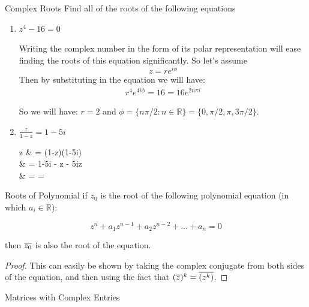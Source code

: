 \begin{example}{Complex Roots}
	Find all of the roots of the following equations
	
	\begin{enumerate}
		\item $z^4 -16 = 0$
		\begin{sol}
			Writing the complex number in the form of its polar representation will ease finding the roots of this equation significantly. So let's assume \[ z = r e^{i\phi} \]
			Then by substituting in the equation we will have:
			\begin{align*}
			r^4 e^{4i\phi} = 16 = 16 e^{2n\pi i}
			\end{align*}
			
			So we will have: $r = 2$ and $\phi = \{ n \pi /2: n \in \mathbb{R} \} = \{ 0, \pi/2, \pi, 3\pi/2 \}$.
		\end{sol}
		\item $\frac{z}{1-z} = 1-5i$
		\begin{sol}
			\begin{flalign*}
				z  & = (1-z)(1-5i) \\
				& = 1-5i - z - 5iz \\
				& =  = 
		\end{flalign*}
		
		\end{sol}
	\end{enumerate}
\end{example}

\begin{propbox}{Roots of Polynomial}
	if $z_0$ is the root of the following polynomial equation (in which $a_i \in \mathbb{R}$):
	
	\[ z^n + a_1 z^{n-1} + a_2 z^{n-2} + \ldots + a_n = 0 \]
	
	then $\overline{z_0}$ is also the root of the equation.

\end{propbox}

\begin{proof}
	This can easily be shown by taking the complex conjugate from both sides of the equation, and then using the fact that $(\overline{z})^k = \overline{(z^k)}$.

\end{proof}


\begin{example}{Matrices with Complex Entries}

\end{example}


